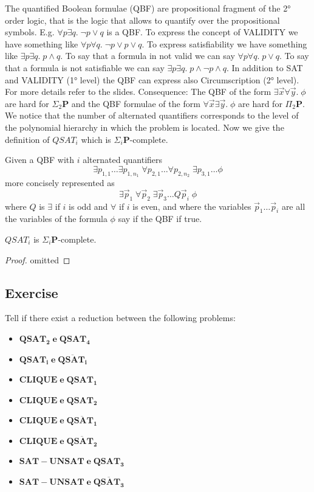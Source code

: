 The quantified Boolean formulae (QBF) are propositional fragment of the 2° order logic, that is the logic that allows to quantify over the propositional symbols. E.g. $\forall p \exists q.\; \neg p\lor q$ is a QBF. To express the concept of VALIDITY we have something like $\forall p\forall q.\;\neg p\lor p\lor q$. To express satisfiability we have something like $\exists p\exists q.\; p\land q$. To say that a formula in not valid we can say $\forall p\forall q.\; p\lor q$. To say that a formula is not satisfiable we can say $\exists p\exists q.\; p\land \neg p\land q$. In addition to SAT and VALIDITY (1° level) the QBF can express also Circumscription (2° level). For more details refer to the slides. Consequence: The QBF of the form $\exists \vec{x}\forall \vec{y}.\; \phi$ are hard for $\Sigma_2\mathbf{P}$ and the QBF formulae of the form $\forall \vec{x}\exists \vec{y}.\; \phi$ are hard for $\Pi_2\mathbf{P}$. We notice that the number of alternated quantifiers corresponds to the level of the polynomial hierarchy in which the problem is located. Now we give the definition of $QSAT_i$ which is $\Sigma_i\mathbf{P}$-complete.\\
\begin{defbox}[$QSAT_i$]
    Given a QBF with $i$ alternated quantifiers
    \[
\exists p_{1,1} \dots \exists p_{1,n_1} \; \forall p_{2,1} \dots \forall p_{2,n_2} \; \exists p_{3,1} \dots \phi
\]
 more concisely represented as
 \[
\exists \vec{p}_1 \; \forall \vec{p}_2 \; \exists \vec{p}_3 \dots Q \vec{p}_i \; \phi
\]
where $Q$ is $\exists$ if $i$ is odd and $\forall$ if $i$ is even, and where the variables $\vec{p}_1\dots\vec{p}_i$ are all the variables of the formula $\phi$ say if the QBF if true.
\end{defbox}
\begin{defbox}[Theorem]
    $QSAT_i$ is $\Sigma_i\mathbf{P}$-complete.
\end{defbox}
\begin{proof}
omitted
\end{proof}
\subsection{Exercise}
Tell if there exist a reduction between the following problems:
\begin{itemize}
    \item $\mathbf{QSAT_2 \; e \; QSAT_4}$
    \item $\mathbf{QSAT_i \; e \; \overline{QSAT_i}}$
    \item $\mathbf{CLIQUE \; e \; QSAT_1}$
    \item $\mathbf{CLIQUE \; e \; QSAT_2}$
    \item $\mathbf{CLIQUE \; e \; \overline{QSAT_1}}$
    \item $\mathbf{CLIQUE \; e \; \overline{QSAT_2}}$
    \item $\mathbf{SAT-UNSAT \; e \; QSAT_3}$
    \item $\mathbf{SAT-UNSAT \; e \; \overline{QSAT_3}}$
\end{itemize}
